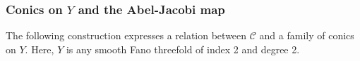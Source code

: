 \documentclass[11pt]{amsart}
\theoremstyle{definition}
\newcommand{\sY}{\mathcal{Y}}
\newcommand{\sM}{\mathcal{M}}
\newcommand{\sC}{\mathcal{C}}
\renewcommand{\P}{\mathbb{P}}
\begin{document}





\subsubsection{Conics on $Y$ and the Abel-Jacobi map}\label{sec_AJY2}


The following construction expresses a relation between $\sC$ and a family of conics on $Y$. Here, $Y$ is any smooth Fano threefold of index 2 and degree 2.

\end{document}
